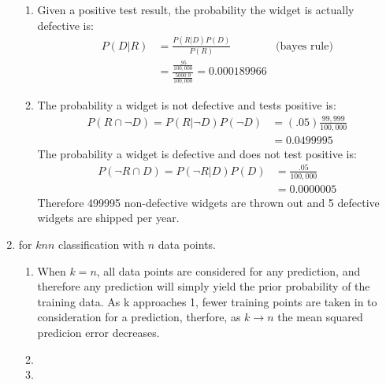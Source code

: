 \documentclass{report}
\begin{document}
\begin{enumerate}
	     
	    \begin{enumerate}[label=(\alph*)]
		\item Given a positive test result, the probability the widget is actually defective is:
	 	\begin{align*}
	 	 P(D \vert R)	&= \frac{P(R \vert D)P(D)}{P(R)} & \text{(bayes rule)} \\
	 	 				&= \frac{\frac{.95}{100,000}}{\frac{5000.9}{100,000}}
	 	 				 = \mathbf{0.000189966}
	    \end{align*}
		\item The probability a widget is not defective and tests positive is:
		\begin{align*}
		P(R \cap \lnot D) = P(R \vert \lnot D)P(\lnot D) 	&= (.05)\frac{99,999}{100,000} \\
															&= 0.0499995
		\end{align*}
		The probability a widget is defective and does not test positive is:
		\begin{align*}
		P(\lnot R \cap D) = P(\lnot R \vert  D)P(D) 	&= \frac{.05}{100,000} \\
														&= 0.0000005
		\end{align*}
		Therefore 499995 non-defective widgets are thrown out and 5 defective widgets are shipped per year.
		\end{enumerate}
		\item for $knn$ classification with $n$ data points.
		\begin{enumerate}
			\item When $k = n$, all data points are considered for any prediction, and therefore any prediction will simply yield the prior probability of the training data. As k approaches 1, fewer training points are taken in to consideration for a prediction, therfore, as $k \rightarrow n$ the mean squared predicion error decreases.
			\item 	
			
			\item 
			

\end{enumerate}
\end{enumerate}
\end{document}
